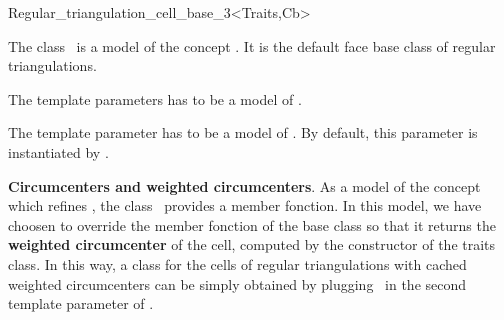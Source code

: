 

\begin{ccRefClass}{Regular_triangulation_cell_base_3<Traits,Cb>}  %


\ccDefinition  
The class \ccRefName\ is a model of the concept
. It is the default face base class
of regular triangulations.





\ccParameters
The template parameters  has to be a model
of .

The template parameter  has to be a model
of . By default, this parameter is
instantiated by
.


\ccIsModel
{}

\ccInheritsFrom
{}


 \ccAccessFunctions
{\bf Circumcenters and weighted circumcenters}.
As a model of the concept  which
refines , the class \ccRefName\  provides a
 member fonction. In this model, we have choosen to
override  the  member fonction
of the base class so that it returns
 the {\bf weighted circumcenter} of the cell,  computed 
 by the  constructor of the traits class.
In this way,  a class for the cells of regular triangulations with
cached weighted circumcenters can be  simply obtained by plugging 
\ccRefName\ in the second template parameter of 
.


\end{ccRefClass}
